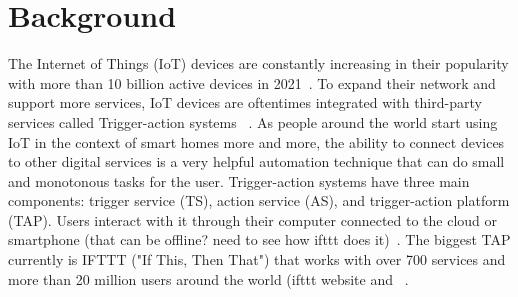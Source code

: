 \section{Background}
\label{sec:background}

The Internet of Things (IoT) devices are constantly increasing in their popularity with more than 10 billion
active devices in 2021~\cite{DBLP:webpage/Bojan/IoTstats}. To expand their network and support more
services, IoT devices are oftentimes integrated with third-party services called Trigger-action systems
~\cite{DBLP:journals/access/XuZZCDG19}. As people around the world start using IoT in the
context of smart homes more and more, the ability to connect devices to other digital services is a very helpful automation technique that can do small and monotonous tasks for the user. Trigger-action systems have three main components: trigger service (TS), action service (AS), and trigger-action platform (TAP). Users interact with it through their computer connected to the cloud or smartphone (that can be offline? need to see how ifttt does it)~\cite{DBLP:conf/sp/ChenCWSCF21}. The biggest TAP currently is IFTTT ("If This, Then That") that works with over 700 services and more than 20 million users around the world (ifttt website and ~\cite{DBLP:conf/sp/ChenCWSCF21}. 